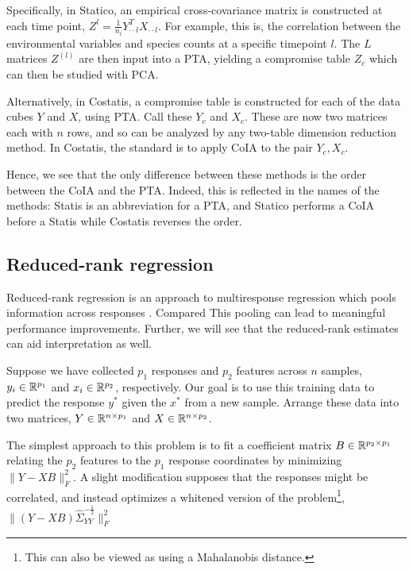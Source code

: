 \documentclass[14pt]{extarticle}
\begin{document}
Specifically, in Statico, an empirical cross-covariance matrix is constructed at
each time point, $Z^{l} = \frac{1}{n_{l}}Y^{T}_{\cdot\cdot l}X_{\cdot \cdot l}$.
For example, this is, the correlation between the environmental variables and
species counts at a specific timepoint $l$. The $L$ matrices $Z^{(l)}$ are then
input into a PTA, yielding a compromise table $Z_{c}$ which can then be studied
with PCA.

Alternatively, in Costatis, a compromise table is constructed for each of the
data cubes $Y$ and $X$, using PTA. Call these $Y_{c}$ and $X_{c}$. These are now
two matrices each with $n$ rows, and so can be analyzed by any two-table
dimension reduction method. In Costatis, the standard is to apply CoIA to the
pair $Y_{c}, X_{c}$.

Hence, we see that the only difference between these methods is the order
between the CoIA and the PTA. Indeed, this is reflected in the names of the
methods: Statis is an abbreviation for a PTA, and Statico performs a CoIA before
a Statis while Costatis reverses the order.

\subsection{Reduced-rank regression}
\label{subsec:label}

Reduced-rank regression is an approach to multiresponse regression which pools
information across responses \citep{izenman1975reduced, mukherjee2011reduced}.
Compared This pooling can lead to meaningful performance improvements. Further,
we will see that the reduced-rank estimates can aid interpretation as well.

Suppose we have collected $p_{1}$ responses and $p_{2}$ features across $n$
samples, $y_{i} \in \mathbb{R}^{p_{1}}$ and $x_{i} \in \mathbb{R}^{p_{2}}$,
respectively. Our goal is to use this training data to predict the response
$y^{\ast}$ given the $x^{\ast}$ from a new sample. Arrange these data into two
matrices, $Y \in \mathbb{R}^{n \times p_{1}}$ and $X \in \mathbb{R}^{n \times p_{2}}$.

The simplest approach to this problem is to fit a coefficient matrix $B \in
\mathbb{R}^{p_{2} \times p_{1}}$ relating the $p_{2}$ features to the $p_{1}$
response coordinates by minimizing $\|Y - XB\|_{F}^{2}$. A slight modification
supposes that the responses might be correlated, and instead optimizes a
whitened version of the problem\footnote{This can also be viewed as using a
  Mahalanobis distance.}, $\|\left(Y -
XB\right)\hat{\Sigma}_{YY}^{-\frac{1}{2}}\|_{F}^{2}$
\end{document}
